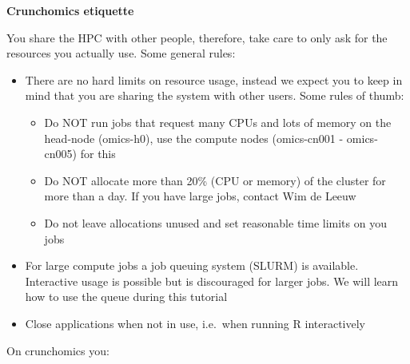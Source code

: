 \documentclass[
  letterpaper,
  DIV=11,
  numbers=noendperiod]{scrreprt}
\providecommand{\tightlist}{%
  \setlength{\itemsep}{0pt}\setlength{\parskip}{0pt}}\usepackage{longtable,booktabs,array}
\begin{document}
\begin{tcolorbox}[enhanced jigsaw, breakable, colframe=quarto-callout-important-color-frame, rightrule=.15mm, bottomtitle=1mm, opacityback=0, toprule=.15mm, left=2mm, title=\textcolor{quarto-callout-important-color}{\faExclamation}\hspace{0.5em}{Important}, leftrule=.75mm, colbacktitle=quarto-callout-important-color!10!white, toptitle=1mm, titlerule=0mm, arc=.35mm, coltitle=black, bottomrule=.15mm, opacitybacktitle=0.6, colback=white]

\textbf{Crunchomics etiquette}

You share the HPC with other people, therefore, take care to only ask
for the resources you actually use. Some general rules:

\begin{itemize}
\tightlist
\item
  There are no hard limits on resource usage, instead we expect you to
  keep in mind that you are sharing the system with other users. Some
  rules of thumb:

  \begin{itemize}
  \tightlist
  \item
    Do NOT run jobs that request many CPUs and lots of memory on the
    head-node (omics-h0), use the compute nodes (omics-cn001 -
    omics-cn005) for this
  \item
    Do NOT allocate more than 20\% (CPU or memory) of the cluster for
    more than a day. If you have large jobs, contact Wim de Leeuw
  \item
    Do not leave allocations unused and set reasonable time limits on
    you jobs
  \end{itemize}
\item
  For large compute jobs a job queuing system (SLURM) is available.
  Interactive usage is possible but is discouraged for larger jobs. We
  will learn how to use the queue during this tutorial
\item
  Close applications when not in use, i.e.~when running R interactively
\end{itemize}

\end{tcolorbox}

On crunchomics you:
\end{document}
